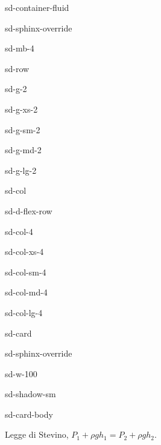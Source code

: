 \documentclass[letterpaper,10pt,italian]{jupyterBook}
\begin{document}
\begin{sphinxuseclass}{sd-container-fluid}
\begin{sphinxuseclass}{sd-sphinx-override}
\begin{sphinxuseclass}{sd-mb-4}
\begin{sphinxuseclass}{sd-row}
\begin{sphinxuseclass}{sd-g-2}
\begin{sphinxuseclass}{sd-g-xs-2}
\begin{sphinxuseclass}{sd-g-sm-2}
\begin{sphinxuseclass}{sd-g-md-2}
\begin{sphinxuseclass}{sd-g-lg-2}
\begin{sphinxuseclass}{sd-col}
\begin{sphinxuseclass}{sd-d-flex-row}
\begin{sphinxuseclass}{sd-col-4}
\begin{sphinxuseclass}{sd-col-xs-4}
\begin{sphinxuseclass}{sd-col-sm-4}
\begin{sphinxuseclass}{sd-col-md-4}
\begin{sphinxuseclass}{sd-col-lg-4}
\begin{sphinxuseclass}{sd-card}
\begin{sphinxuseclass}{sd-sphinx-override}
\begin{sphinxuseclass}{sd-w-100}
\begin{sphinxuseclass}{sd-shadow-sm}
\begin{sphinxuseclass}{sd-card-body}
\end{sphinxuseclass}
\end{sphinxuseclass}
\end{sphinxuseclass}
\end{sphinxuseclass}
\end{sphinxuseclass}
\end{sphinxuseclass}
\end{sphinxuseclass}
\end{sphinxuseclass}
\end{sphinxuseclass}
\end{sphinxuseclass}
\end{sphinxuseclass}
\end{sphinxuseclass}
\end{sphinxuseclass}
\end{sphinxuseclass}
\end{sphinxuseclass}
\end{sphinxuseclass}
\end{sphinxuseclass}
\end{sphinxuseclass}
\end{sphinxuseclass}
\end{sphinxuseclass}
\end{sphinxuseclass}
\sphinxAtStartPar
{} Legge di Stevino, \(P_1 + \rho g h_1 = P_2 + \rho g h_2\).
\end{document}
